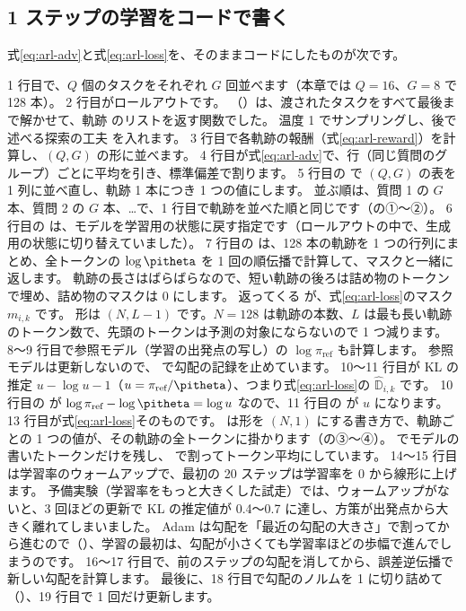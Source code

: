 \subsection{1 ステップの学習をコードで書く}

式\eqref{eq:arl-adv}と式\eqref{eq:arl-loss}を、そのままコードにしたものが次です。


1 行目で、$Q$ 個のタスクをそれぞれ $G$ 回並べます（本章では $Q=16$、$G=8$ で 128 本）。
2 行目がロールアウトです。
（）は、渡されたタスクをすべて最後まで解かせて、軌跡  のリストを返す関数でした。
温度 1 でサンプリングし、後で述べる探索の工夫  を入れます。
3 行目で各軌跡の報酬（式\eqref{eq:arl-reward}）を計算し、$(Q,G)$ の形に並べます。
4 行目が式\eqref{eq:arl-adv}で、行（同じ質問のグループ）ごとに平均を引き、標準偏差で割ります。
5 行目の  で $(Q,G)$ の表を 1 列に並べ直し、軌跡 1 本につき 1 つの値にします。
並ぶ順は、質問 1 の $G$ 本、質問 2 の $G$ 本、…で、1 行目で軌跡を並べた順と同じです（の①〜②）。
6 行目の  は、モデルを学習用の状態に戻す指定です（ロールアウトの中で、生成用の状態に切り替えていました）。
7 行目の  は、128 本の軌跡を 1 つの行列にまとめ、全トークンの $\log\pitheta$ を 1 回の順伝播で計算して、マスクと一緒に返します。
軌跡の長さはばらばらなので、短い軌跡の後ろは詰め物のトークンで埋め、詰め物のマスクは 0 にします。
返ってくる  が、式\eqref{eq:arl-loss}のマスク $m_{i,k}$ です。
形は $(N, L-1)$ です。$N=128$ は軌跡の本数、$L$ は最も長い軌跡のトークン数で、先頭のトークンは予測の対象にならないので 1 つ減ります。
8〜9 行目で参照モデル（学習の出発点の写し）の $\log\pi_{\text{ref}}$ も計算します。
参照モデルは更新しないので、 で勾配の記録を止めています。
10〜11 行目が KL の推定 $u-\log u-1$（$u=\pi_{\text{ref}}/\pitheta$）、つまり式\eqref{eq:arl-loss}の $\hat{\mathbb{D}}_{i,k}$ です。
10 行目の  が $\log\pi_{\text{ref}}-\log\pitheta=\log u$ なので、11 行目の  が $u$ になります。
13 行目が式\eqref{eq:arl-loss}そのものです。 は形を $(N,1)$ にする書き方で、軌跡ごとの 1 つの値が、その軌跡の全トークンに掛かります（の③〜④）。
 でモデルの書いたトークンだけを残し、 で割ってトークン平均にしています。
14〜15 行目は学習率のウォームアップで、最初の 20 ステップは学習率を 0 から線形に上げます。
予備実験（学習率をもっと大きくした試走）では、ウォームアップがないと、3 回ほどの更新で KL の推定値が 0.4〜0.7 に達し、方策が出発点から大きく離れてしまいました。
Adam は勾配を「最近の勾配の大きさ」で割ってから進むので（）、学習の最初は、勾配が小さくても学習率ほどの歩幅で進んでしまうのです。
16〜17 行目で、前のステップの勾配を消してから、誤差逆伝播で新しい勾配を計算します。
最後に、18 行目で勾配のノルムを 1 に切り詰めて（）、19 行目で 1 回だけ更新します。

